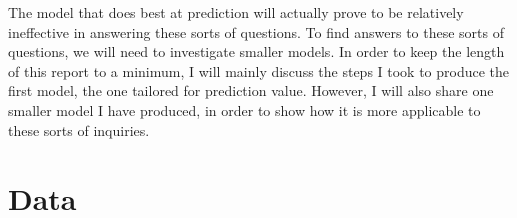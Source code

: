 \documentclass[12pt]{article}
\begin{document}
The model that does best at prediction will actually prove to be relatively ineffective in answering these sorts of questions.  To find answers to these sorts of questions, we will need to investigate smaller models.  In order to keep the length of this report to a minimum, I will mainly discuss the steps I took to produce the first model, the one tailored for prediction value.  However, I will also share one smaller model I have produced, in order to show how it is more applicable to these sorts of inquiries.

\section{Data}
\end{document}
